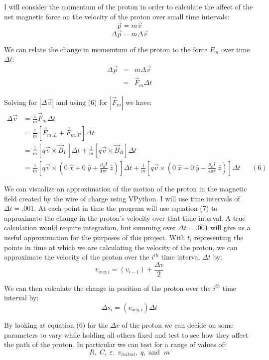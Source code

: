 \documentclass[11pt]{article}
\begin{document}
\newpage

\noindent I will consider the momentum of the proton in order to calculate the affect of the net magnetic force on the velocity of the proton over small time intervals:
\[
\vec{p}=m\vec{v}
\] 
\[
\Delta\vec{p}=m\Delta\vec{v}
\]

\vspace{.2in}

\noindent We can relate the change in momemtum of the proton to the force $F_m$ over time $\Delta t$:
\begin{eqnarray*}
\Delta\vec{p}&=&m\Delta\vec{v}\\&=&\vec{F}_m\Delta t
\end{eqnarray*}

\vspace{.2in}

\noindent Solving for $\left|\Delta\vec{v}\right|$ and using (6) for $\left|\vec{F}_m\right|$ we have:
\begin{align*}
\Delta\vec{v}&=\frac{1}{m}\vec{F}_m\Delta t\\&=\frac{1}{m}\left[\vec{F}_{m,L}+\vec{F}_{m,R}\right]\Delta t\\&=\frac{1}{m}\left[q\vec{v}\times\vec{B}_L\right]\Delta t + \frac{1}{m}\left[q\vec{v}\times\vec{B}_R\right]\Delta t\\&=\frac{1}{m}\left[q\vec{v}\times\left(0\;\hat{x}+0\;\hat{y}+\frac{\mu_0I}{4\pi r}\;\hat{z}\right)\right]\Delta t + \frac{1}{m}\left[q\vec{v}\times\left(0\;\hat{x}+0\;\hat{y}-\frac{\mu_0I}{4\pi r}\;\hat{z}\right)\right]\Delta t&&(6)
\end{align*} 

\vspace{.2in}

\noindent We can visualize an approximation of the motion of the proton in the magnetic field created by the wire of charge using VPython. I will use time intervals of $\Delta t=.001$. At each point in time the program will use equation (7) to approximate the change in the proton's velocity over that time interval. A true calculation would require integration, but summing over $\Delta t=.001$ will give us a useful approximation for the purposes of this project. With $t_i$ representing the points in time at which we are calculating the velocity of the proton, we can approximate the velocity of the proton over the $i^{th}$ time interval $\Delta t$ by:
\[
v_{avg,i}=\left(v_{i-1}\right)+\frac{\Delta v}{2}
\]

\vspace{.2in}

\noindent We can then calculate the change in position of the proton over the $i^{th}$ time interval by:
\[
\Delta s_i=\left(v_{avg,i}\right)\Delta t
\]

\vspace{.2in}

\noindent By looking at equation (6) for the $\Delta v$ of the proton we can decide on some parameters to vary while holding all others fixed and test to see how they affect the path of the proton. In particular we can test for a range of values of:
\[
R,\;C,\;\varepsilon,\;v_{initial},\;q,\;\text{and}\;\;m
\]
\end{document}
